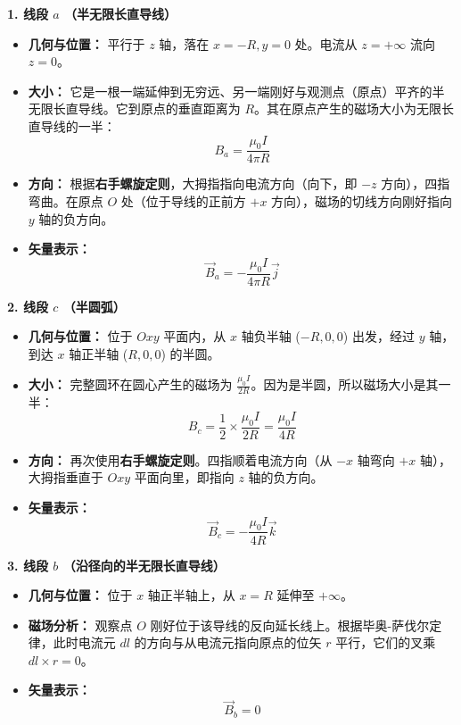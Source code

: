 \textbf{1. 线段 $a$ （半无限长直导线）}
\begin{itemize}
	\item \textbf{几何与位置：} 平行于 $z$ 轴，落在 $x = -R, y = 0$ 处。电流从 $z = +\infty$ 流向 $z = 0$。
	\item \textbf{大小：} 它是一根一端延伸到无穷远、另一端刚好与观测点（原点）平齐的半无限长直导线。它到原点的垂直距离为 $R$。其在原点产生的磁场大小为无限长直导线的一半：
	\begin{equation}\label{eq:9-10-1}
		B_a = \frac{\mu_0 I}{4\pi R}
	\end{equation}
	\item \textbf{方向：} 根据\textbf{右手螺旋定则}，大拇指指向电流方向（向下，即 $-z$ 方向），四指弯曲。在原点 $O$ 处（位于导线的正前方 $+x$ 方向），磁场的切线方向刚好指向 $y$ 轴的负方向。
	\item \textbf{矢量表示：}
	\begin{equation}\label{eq:9-10-2}
		\vec{B}_a = -\frac{\mu_0 I}{4\pi R}\vec{j}
	\end{equation}
\end{itemize}

\textbf{2. 线段 $c$ （半圆弧）}
\begin{itemize}
	\item \textbf{几何与位置：} 位于 $Oxy$ 平面内，从 $x$ 轴负半轴 ($-R, 0, 0$) 出发，经过 $y$ 轴，到达 $x$ 轴正半轴 ($R, 0, 0$) 的半圆。
	\item \textbf{大小：} 完整圆环在圆心产生的磁场为 $\frac{\mu_0 I}{2R}$。因为是半圆，所以磁场大小是其一半：
	\begin{equation}\label{eq:9-10-3}
		B_c = \frac{1}{2} \times \frac{\mu_0 I}{2R} = \frac{\mu_0 I}{4R}
	\end{equation}
	\item \textbf{方向：} 再次使用\textbf{右手螺旋定则}。四指顺着电流方向（从 $-x$ 轴弯向 $+x$ 轴），大拇指垂直于 $Oxy$ 平面向里，即指向 $z$ 轴的负方向。
	\item \textbf{矢量表示：}
	\begin{equation}\label{eq:9-10-4}
		\vec{B}_c = -\frac{\mu_0 I}{4R}\vec{k}
	\end{equation}
\end{itemize}

\textbf{3. 线段 $b$ （沿径向的半无限长直导线）}
\begin{itemize}
	\item \textbf{几何与位置：} 位于 $x$ 轴正半轴上，从 $x = R$ 延伸至 $+\infty$。
	\item \textbf{磁场分析：} 观察点 $O$ 刚好位于该导线的反向延长线上。根据毕奥-萨伐尔定律，此时电流元 $dl$ 的方向与从电流元指向原点的位矢 $r$ 平行，它们的叉乘 $dl \times r = 0$。
	\item \textbf{矢量表示：}
	\begin{equation}\label{eq:9-10-5}
		\vec{B}_b = 0
	\end{equation}
\end{itemize}

